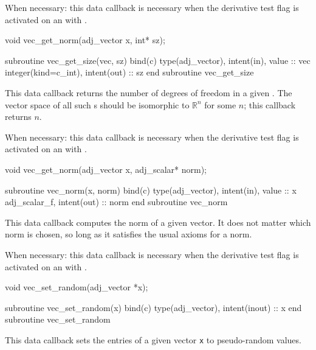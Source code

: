 When necessary: this data callback is necessary when the derivative test flag
is activated on an  with .
\begin{framed}
\begin{minipage}{\columnwidth}
\begin{ccode}
  void vec_get_norm(adj_vector x, int* sz);
\end{ccode}
\begin{fortrancode}
  subroutine vec_get_size(vec, sz) bind(c)
    type(adj_vector), intent(in), value :: vec
    integer(kind=c_int), intent(out) :: sz
  end subroutine vec_get_size
\end{fortrancode}
\end{minipage}
\end{framed}
This data callback returns the number of degrees of freedom in a given . The
vector space of all such s should be isomorphic to $\mathbb{R}^n$ for some $n$;
this callback returns $n$.

When necessary: this data callback is necessary when the derivative test flag
is activated on an  with .
\begin{framed}
\begin{minipage}{\columnwidth}
\begin{ccode}
  void vec_get_norm(adj_vector x, adj_scalar* norm);
\end{ccode}
\begin{fortrancode}
  subroutine vec_norm(x, norm) bind(c)
    type(adj_vector), intent(in), value :: x
    adj_scalar_f, intent(out) :: norm
  end subroutine vec_norm
\end{fortrancode}
\end{minipage}
\end{framed}
This data callback computes the norm of a given vector. It does not matter
which norm is chosen, so long as it satisfies the usual axioms for a norm.

When necessary: this data callback is necessary when the derivative test flag
is activated on an  with .

\begin{framed}
\begin{minipage}{\columnwidth}
\begin{ccode}
  void vec_set_random(adj_vector *x);
\end{ccode}
\begin{fortrancode}
  subroutine vec_set_random(x) bind(c)
    type(adj_vector), intent(inout) :: x
  end subroutine vec_set_random
\end{fortrancode}
\end{minipage}
\end{framed}
This data callback sets the entries of a given vector \texttt{x} to pseudo-random values.

